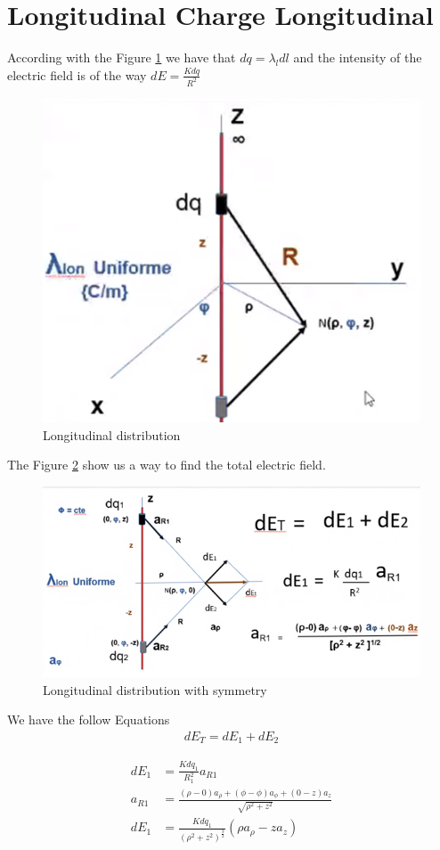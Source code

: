 \documentclass[12pt,letterpaper]{book}
\begin{document}
\section{Longitudinal Charge Longitudinal}

According with the Figure \ref{longitudinal1} we have that $dq=\lambda _l dl$ and the intensity of the electric field is of the way $dE=\frac{Kdq}{R^2}$

\begin{figure}[H]
\centering
\includegraphics[width=.5\linewidth]{figures/longitudinal1.png}
\caption{Longitudinal distribution}
\label{longitudinal1}
\end{figure}

The Figure \ref{longitudinal2} show us a way to find the total electric field. 

\begin{figure}[H]
\centering
\includegraphics[width=.5\linewidth]{figures/longitudinal2.png}
\caption{Longitudinal distribution with symmetry}
\label{longitudinal2}
\end{figure}

We have the follow Equations
\begin{align*}
dE_T=dE_1+dE_2
\end{align*}

\begin{align*}
dE_1&=\frac{Kdq_1}{R_1^2}a_{R1}\\
a_{R1}&=\frac{(\rho -0)a_{\rho }+(\phi -\phi)a_{\phi }+(0-z)a_z }{\sqrt{\rho ^2 + z^2}}\\
dE_1&=\frac{Kdq_1}{(\rho ^2 + z^2)^{\frac{3}{2}}} (\rho a_{\rho }-za_z) 
\end{align*}
\end{document}
